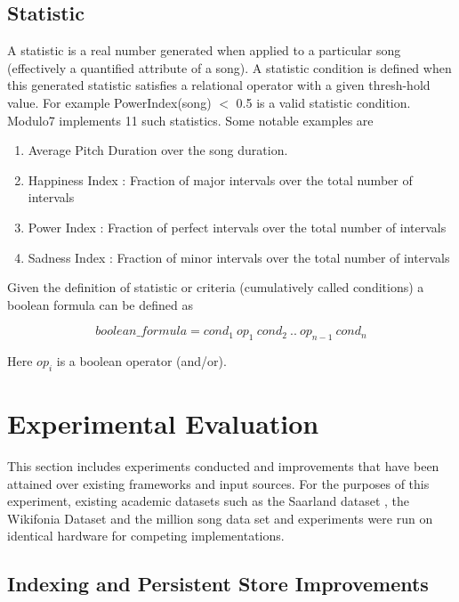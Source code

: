 \documentclass{article}
\begin{document}
\subsection{Statistic}

A statistic is a real number generated when applied to a particular song (effectively a quantified attribute of a song). A statistic condition is defined when this generated statistic satisfies a relational operator with a given thresh-hold value. For example PowerIndex(song) $<$ 0.5 is a valid statistic condition. Modulo7 implements 11 such statistics. Some notable examples are 

\begin{enumerate}
\item Average Pitch Duration over the song duration. 
\item Happiness Index : Fraction of major intervals over the total number of intervals
\item Power Index : Fraction of perfect intervals over the total number of intervals
\item Sadness Index : Fraction of minor intervals over the total number of intervals
\end{enumerate}

\noindent Given the definition of statistic or criteria (cumulatively called conditions) a boolean formula can be defined as 

\begin{equation}
boolean\_formula = cond_1 \ op_1 \ cond_2 \ .. \ op_{n-1} \ cond_n
\end{equation}
 
\noindent Here $op_i$ is a boolean operator (and/or).  

\section{Experimental Evaluation}

This section includes experiments conducted and improvements that have been attained over existing frameworks and input sources. For the purposes of this experiment, existing academic datasets such as the Saarland dataset \cite{saarlandmsd}, the Wikifonia Dataset \cite{WikifoniaDataset} and the million song data set \cite{msd} and experiments were run on identical hardware for competing implementations. 

\subsection{Indexing and Persistent Store Improvements}
\end{document}
